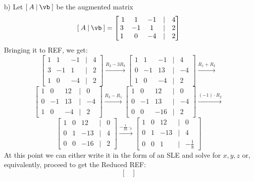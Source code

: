 \begin{solution}
    b) Let $[\:A\:|\:\vb\:] $ be the augmented matrix
 \[ [\:A\:|\:\vb\:] = \begin{bmatrix}\

     1&1&-1&\vert&4\\
     3&-1&1&\vert&2\\
     1&0&-4&\vert&2
 \end{bmatrix} \]
 Bringing it to REF, we get:
 \[
 \begin{bmatrix}

     1&1&-1&\vert&4\\
     3&-1&1&\vert&2\\
     1&0&-4&\vert&2
 \end{bmatrix} 
 \xrightarrow{R_2-3R_3}
 \begin{bmatrix}
     1&1&-1&\vert&4\\
     0&-1&13&\vert&-4\\
     1&0&-4&\vert&2
 \end{bmatrix} 
 \xrightarrow{R_1+R_2}\]\[
 \begin{bmatrix}
     1&0&12&\vert&0\\
     0&-1&13&\vert&-4\\
     1&0&-4&\vert&2
 \end{bmatrix} 
 \xrightarrow{R_3-R_1}
 \begin{bmatrix}
     1&0&12&\vert&0\\
     0&-1&13&\vert&-4\\
     0&0&-16&\vert&2
 \end{bmatrix} 
 \xrightarrow{(-1)\cdot R_2}\]\[
 \begin{bmatrix}
     1&0&12&\vert&0\\
     0&1&-13&\vert&4\\
     0&0&-16&\vert&2
 \end{bmatrix} 
 \xrightarrow{-\frac{1}{16}\cdot _3}
 \begin{bmatrix}
     1&0&12&\vert&0\\
     0&1&-13&\vert&4\\
     0&0&1&\vert&-\frac{1}{8}
 \end{bmatrix} 
 \]
 At this point we can either write it in the form of an SLE and solve for $x,y,z$ or, equivalently, proceed to get the Reduced REF:
 \[
 \begin{bmatrix}


\end{bmatrix}\]
\end{solution}
